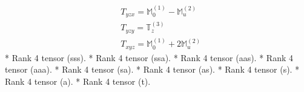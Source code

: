 \documentclass[fleqn,8pt,landscape]{jsarticle}
\begin{document}
\begin{align*}
& T_{yzx} = \mathbb{M}_{0}^{(1)} - \mathbb{M}_{u}^{(2)} \\
& T_{yzy} = \mathbb{T}_{z}^{(3)} \\
& T_{xyz} = \mathbb{M}_{0}^{(1)} + 2 \mathbb{M}_{u}^{(2)}
\end{align*}
* Rank 4 tensor (sss).
* Rank 4 tensor (ssa).
* Rank 4 tensor (aas).
* Rank 4 tensor (aaa).
* Rank 4 tensor (sa).
* Rank 4 tensor (as).
* Rank 4 tensor (s).
* Rank 4 tensor (a).
* Rank 4 tensor (t).
\end{document}
